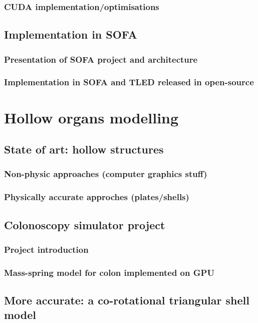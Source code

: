 		\section{CUDA implementation/optimisations }

	\chapter{Implementation in SOFA}
		\section{Presentation of SOFA project and architecture}
		\section{Implementation in SOFA and TLED released in open-source}



\part{Hollow organs modelling}

	\chapter{State of art: hollow structures}
		\section{Non-physic approaches (computer graphics stuff)}
		\section{Physically accurate approches (plates/shells)}

	\chapter{Colonoscopy simulator project}
		\section{Project introduction}
		\section{Mass-spring model for colon implemented on GPU }

	\chapter{More accurate: a co-rotational triangular shell model }
